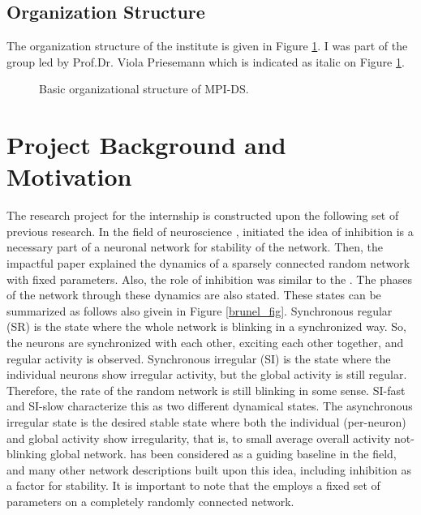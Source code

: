\documentclass[a4paper,12pt]{article}
\begin{document}
\subsection{Organization Structure}
The organization structure of the institute is given in Figure \ref{organization}. I was part of the group led by Prof.Dr. Viola Priesemann which is indicated as italic on Figure \ref{organization}.

\begin{figure}[htb!] 
    \caption{Basic organizational structure of MPI-DS.}
    \label{organization}
\end{figure}

\section{Project Background and Motivation}
The research project for the internship is constructed upon the following set of previous research. In the field of neuroscience \cite{CHAOS}, initiated the idea of inhibition is a necessary part of a neuronal network for stability of the network. Then, the impactful paper \cite{brunel} explained the dynamics of a sparsely connected random network with fixed parameters. Also, the role of inhibition was similar to the \cite{CHAOS}. The phases of the network through these dynamics are also stated. These states can be summarized as follows also givein in Figure \ref{brunel_fig}. Synchronous regular (SR) is the state where the whole network is blinking in a synchronized way. So, the neurons are synchronized with each other, exciting each other together, and regular activity is observed. Synchronous irregular (SI) is the state where the individual neurons show irregular activity, but the global activity is still regular. Therefore, the rate of the random network is still blinking in some sense. SI-fast and SI-slow characterize this as two different dynamical states. The asynchronous irregular state is the desired stable state where both the individual (per-neuron) and global activity show irregularity, that is, to small average overall activity not-blinking global network. \cite{brunel} has been considered as a guiding baseline in the field, and many other network descriptions built upon this idea, including inhibition as a factor for stability. It is important to note that the \cite{brunel} employs a fixed set of parameters on a completely randomly connected network.
\end{document}
